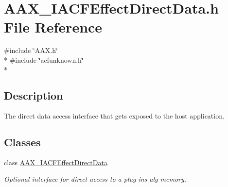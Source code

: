 \hypertarget{a00222}{}\section{A\+A\+X\+\_\+\+I\+A\+C\+F\+Effect\+Direct\+Data.\+h File Reference}
\label{a00222}
{\ttfamily \#include \char`\"{}A\+A\+X.\+h\char`\"{}}\\*
{\ttfamily \#include \char`\"{}acfunknown.\+h\char`\"{}}\\*


\subsection{Description}
The direct data access interface that gets exposed to the host application. 

\subsection*{Classes}
\begin{DoxyCompactItemize}
\item 
class \hyperlink{a00059}{A\+A\+X\+\_\+\+I\+A\+C\+F\+Effect\+Direct\+Data}
\begin{DoxyCompactList}\small\item\em Optional interface for direct access to a plug-\/in\textquotesingle{}s alg memory. \end{DoxyCompactList}\end{DoxyCompactItemize}
